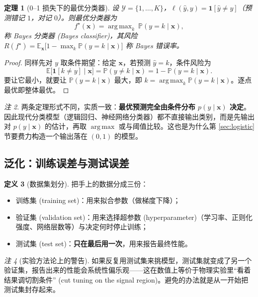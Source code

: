 \documentclass[UTF8,a4paper,11pt]{ctexart}
\theoremstyle{definition}
\newtheorem{definition}{定义}[section]
\theoremstyle{plain}
\newtheorem{theorem}[definition]{定理}
\theoremstyle{remark}
\newtheorem{remark}[definition]{注}
\DeclareMathOperator*{\argmax}{arg\,max}
\newcommand{\E}{\mathbb{E}}
\newcommand{\Prob}{\mathbb{P}}
\newcommand{\eng}[1]{\textup{(#1)}}
\begin{document}
\begin{theorem}[0--1 损失下的最优分类器]\label{thm:bayes-cls}
设 $\mathcal{Y}=\{1,\dots,K\}$，$\ell(\hat y,y)=\bm{1}[\hat y\ne y]$（预测错记 $1$，对记 $0$）。则最优分类器为
\[
  f^\star(\bm{x})=\argmax_{k}\ \Prob(y=k\mid\bm{x}),
\]
称 Bayes 分类器 \eng{Bayes classifier}，其风险 $R(f^\star)=\E_{\bm{x}}\big[1-\max_k\Prob(y=k\mid\bm{x})\big]$ 称 Bayes 错误率。
\end{theorem}

\begin{proof}
同样先对 $y$ 取条件期望：给定 $\bm{x}$，若预测 $\hat y=k$，条件风险为
\[
  \E\big[\bm{1}[k\ne y]\mid\bm{x}\big]=\Prob(y\ne k\mid\bm{x})=1-\Prob(y=k\mid\bm{x}).
\]
要让它最小，就要让 $\Prob(y=k\mid\bm{x})$ 最大，即 $k=\argmax_k\Prob(y=k\mid\bm{x})$。逐点最优即整体最优。
\end{proof}

\begin{remark}
两条定理形式不同，实质一致：\textbf{最优预测完全由条件分布 $p(y\mid\bm{x})$ 决定}。因此现代分类模型（逻辑回归、神经网络分类器）都不直接输出类别，而是先输出对 $p(y\mid\bm{x})$ 的估计，再取 $\argmax$ 或与阈值比较。这也是为什么第 \ref{sec:logistic} 节要费力构造一个输出落在 $(0,1)$ 的模型。
\end{remark}

\subsection{泛化：训练误差与测试误差}

\begin{definition}[数据集划分]\label{def:split}
把手上的数据分成三份：
\begin{itemize}
  \item 训练集 \eng{training set}：用来拟合参数（做梯度下降）；
  \item 验证集 \eng{validation set}：用来选择超参数 \eng{hyperparameter}（学习率、正则化强度、网络层数等）与决定何时停止训练；
  \item 测试集 \eng{test set}：\textbf{只在最后用一次}，用来报告最终性能。
\end{itemize}
\end{definition}

\begin{remark}[实验方法论上的警告]
如果反复用测试集来挑模型，测试集就变成了另一个验证集，报告出来的性能会系统性偏乐观——这在数值上等价于物理实验里“看着结果调切割条件” \eng{cut tuning on the signal region}。避免的办法就是从一开始把测试集封存起来。
\end{remark}
\end{document}
